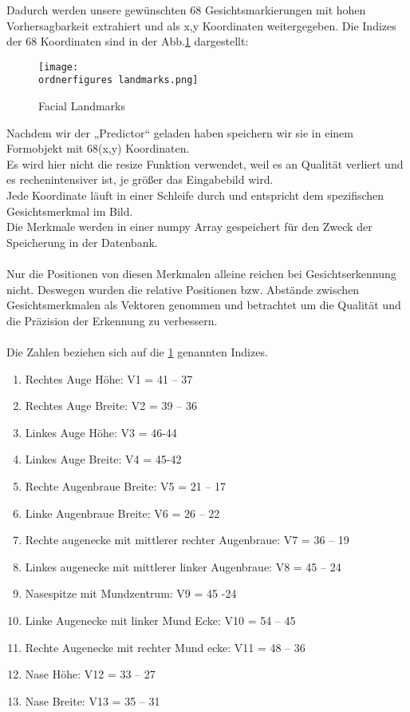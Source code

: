 Dadurch werden unsere gewünschten 68 Gesichtsmarkierungen mit hohen Vorhersagbarkeit extrahiert und als x,y Koordinaten weitergegeben. 
Die Indizes der 68 Koordinaten sind in der Abb.\ref{fig:landmarks} dargestellt:\\




\begin{figure}[H]
	\texttt{[image: \\ordnerfigures landmarks.png]}
	\caption{Facial Landmarks}
	\label{fig:landmarks}
	\cite{Kazemi2014OneMF}
\end{figure}

Nachdem wir der „Predictor“ geladen haben speichern wir sie in einem Formobjekt mit 68(x,y) Koordinaten. \\
Es wird hier nicht die resize Funktion verwendet, weil es an Qualität verliert und es rechenintensiver ist, je größer das Eingabebild wird. \\
Jede Koordinate läuft in einer Schleife durch und entspricht dem spezifischen Gesichtsmerkmal im Bild.  \\
Die Merkmale werden in einer numpy Array gespeichert für den Zweck der Speicherung in der Datenbank. \\\\
Nur die Positionen von diesen Merkmalen alleine reichen bei Gesichtserkennung nicht. Deswegen wurden die relative Positionen bzw. Abstände zwischen Gesichtsmerkmalen als Vektoren genommen und betrachtet um die Qualität und die Präzision der Erkennung zu verbessern. \\\\
Die Zahlen beziehen sich auf die \ref{fig:landmarks} genannten Indizes. \\
\begin{enumerate}
	\item Rechtes Auge Höhe: V1 = 41 – 37 
	\item Rechtes Auge Breite: V2 = 39 – 36
	\item Linkes Auge Höhe: V3 = 46-44
	\item Linkes Auge Breite: V4 = 45-42
	\item Rechte Augenbraue Breite: V5 = 21 – 17
	\item Linke Augenbraue Breite: V6 = 26 – 22 
	\item Rechte augenecke mit mittlerer rechter Augenbraue: V7 = 36 – 19 
	\item Linkes augenecke mit mittlerer linker Augenbraue: V8 = 45 – 24 
	\item Nasespitze mit Mundzentrum: V9 = 45 -24 
	\item Linke Augenecke mit linker Mund Ecke: V10 = 54 – 45
	\item Rechte Augenecke mit rechter Mund ecke: V11 = 48 – 36 
	\item Nase Höhe: V12 = 33 – 27 
	\item Nase Breite: V13 = 35 – 31 
\end{enumerate}







